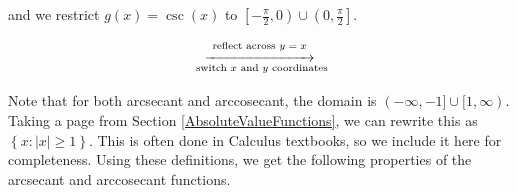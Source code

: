 \documentclass[12pt]{ximera}
\begin{document}
and we restrict $g(x) = \csc(x)$ to $\left[-\frac{\pi}{2}, 0\right) \cup \left(0,  \frac{\pi}{2}\right]$. 

 \[ \begin{array}{ccc}



&

\stackrel{\stackrel{\mbox{\scriptsize reflect across $y=x$}}{\xrightarrow{\hspace{1in}}}}{\mbox{ \scriptsize switch $x$ and $y$ coordinates}} 

&



\end{array}\]

Note that for both arcsecant and arccosecant, the domain is $(-\infty, -1] \cup [1, \infty)$.  Taking a page from Section \ref{AbsoluteValueFunctions}, we can rewrite this as $\left\{ x : |x| \geq 1\right\}$.  This is often done in Calculus textbooks, so we include it here for completeness.  Using these definitions, we get the following properties of the arcsecant and arccosecant functions.
\end{document}
